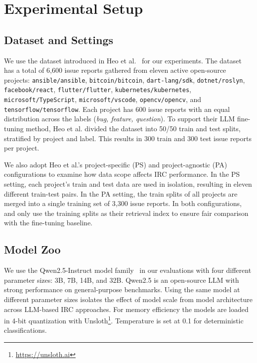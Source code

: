 \section{Experimental Setup}
\label{sec:setup}

\subsection{Dataset and Settings}
\label{sec:setup-dataset}
We use the dataset introduced in Heo et al.~\cite{heo2025study} for our experiments. The dataset has a total of 6,600 issue reports gathered from eleven active open-source projects:
\texttt{ansible/ansible}, \texttt{bitcoin/bitcoin},
\texttt{dart-lang/sdk}, \texttt{dotnet/roslyn},
\texttt{facebook/react}, \texttt{flutter/flutter},
\texttt{kubernetes/kubernetes}, \texttt{microsoft/TypeScript},
\texttt{microsoft/vscode}, \texttt{opencv/opencv}, and
\texttt{tensorflow/tensorflow}. Each project has 600 issue reports
with an equal distribution across the labels
(\textit{bug, feature, question}). To support their LLM fine-tuning
method, Heo et al. divided the dataset into 50/50 train and test
splits, stratified by project and label. This results in 300 train
and 300 test issue reports per project.

We also adopt Heo et al.'s project-specific (PS) and project-agnostic
(PA) configurations to examine how data scope affects IRC performance.
In the PS setting, each project's train and test data are used in
isolation, resulting in eleven different train-test pairs. In the PA
setting, the train splits of all projects are merged into a single
training set of 3,300 issue reports. In both configurations, \ragtag
and \votag only use the training splits as their retrieval index to
ensure fair comparison with the fine-tuning baseline.

\subsection{Model Zoo}
\label{sec:setup-models}
We use the Qwen2.5-Instruct model family~\cite{yang2024qwen25} in our evaluations with four different parameter sizes: 3B, 7B, 14B, and 32B. Qwen2.5 is an open-source LLM with strong performance on general-purpose benchmarks. Using the same model at different parameter sizes isolates the effect of model scale from model architecture across LLM-based IRC approaches. For memory efficiency the models are loaded in 4-bit quantization with Unsloth\footnote{\url{https://unsloth.ai}}. Temperature is set at 0.1 for deterministic classifications.


